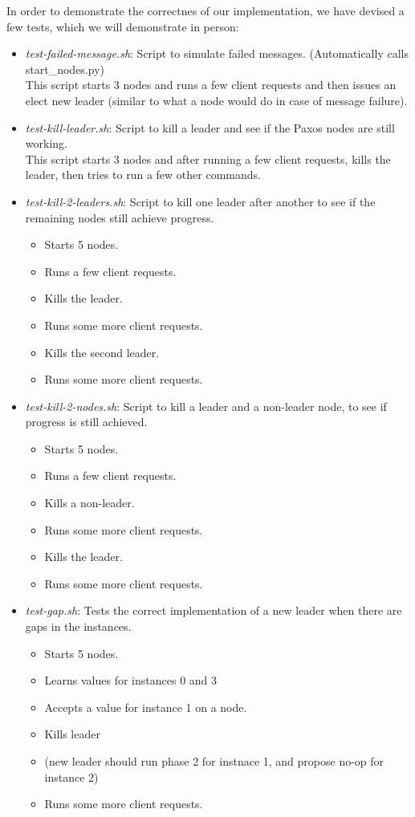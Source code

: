 \documentclass[letterpaper]{article}
\begin{document}
In order to demonstrate the correctnes of our implementation, we have devised a
few tests, which we will demonstrate in person:
\begin{itemize}
\item {\em test-failed-message.sh}: Script to simulate failed messages.
(Automatically calls start\_nodes.py)\\ This script starts 3 nodes and runs a
few client requests and then issues an elect new leader (similar to what a node
would do in case of message failure). 
\item {\em test-kill-leader.sh}: Script to kill a leader and see if the Paxos
nodes are still working.\\ This script starts 3 nodes and after running a few
client requests, kills the leader, then tries to run a few other commands. 
\pagebreak
\item {\em test-kill-2-leaders.sh}: Script to kill one leader after another
to see if the remaining nodes still achieve
progress.

\begin{itemize}
\item Starts 5 nodes.
\item Runs a few client requests.
\item Kills the leader.
\item Runs some more client requests.
\item Kills the second leader.
\item Runs some more client requests.
\end{itemize}

\item {\em test-kill-2-nodes.sh}: Script to kill a leader and a non-leader node,
to see if progress is still achieved. 
\begin{itemize}
\item Starts 5 nodes.
\item Runs a few client requests.
\item Kills a non-leader.
\item Runs some more client requests.
\item Kills the leader.
\item Runs some more client requests.
\end{itemize}

\item {\em test-gap.sh}: Tests the correct implementation of a new leader when
there are gaps in the instances.
\begin{itemize}
\item Starts 5 nodes. 
\item Learns values for instances 0 and 3
\item Accepts a value for instance 1 on a node.
\item Kills leader
\item (new leader should run phase 2 for instnace 1, and propose no-op for instance 2)
\item Runs some more client requests.
\end{itemize}

\end{itemize}
\end{document}
